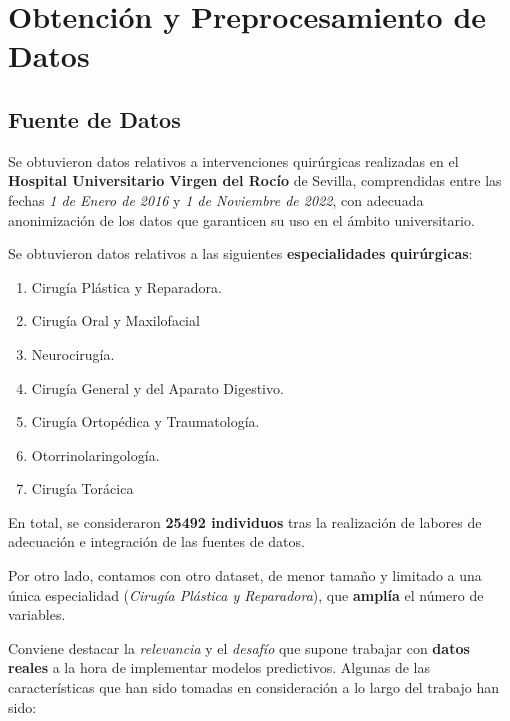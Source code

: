 
\section{Obtención y Preprocesamiento de Datos}

\subsection{Fuente de Datos}

Se obtuvieron datos relativos a intervenciones quirúrgicas realizadas en el \textbf{Hospital Universitario Virgen del Rocío} de Sevilla, comprendidas entre las fechas \textit{1 de Enero de 2016} y \textit{1 de Noviembre de 2022}, con adecuada anonimización de los datos que garanticen su uso en el ámbito universitario.

Se obtuvieron datos relativos a las siguientes \textbf{especialidades quirúrgicas}:
\begin{enumerate}
    \item Cirugía Plástica y Reparadora.
    \item Cirugía Oral y Maxilofacial
    \item Neurocirugía.
    \item Cirugía General y del Aparato Digestivo.
    \item Cirugía Ortopédica y Traumatología.
    \item Otorrinolaringología.
    \item Cirugía Torácica
\end{enumerate}


En total, se consideraron \textbf{25492 individuos} tras la realización de labores de adecuación e integración de las fuentes de datos.


Por otro lado, contamos con otro dataset, de menor tamaño y limitado a una única especialidad (\textit{Cirugía Plástica y Reparadora}), que \textbf{amplía} el número de variables.
 

Conviene destacar la \textit{relevancia} y el \textit{desafío} que supone trabajar con \textbf{datos reales} a la hora de implementar modelos predictivos.
Algunas de las características que han sido tomadas en consideración a lo largo del trabajo han sido:

